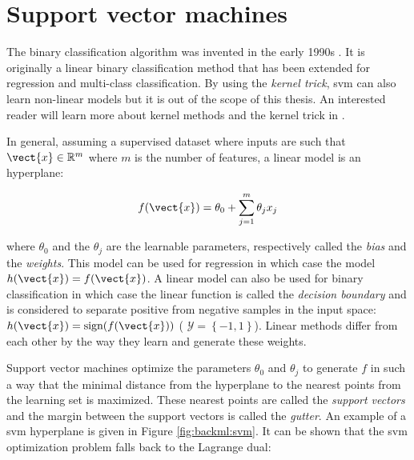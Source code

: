 
\section{Support vector machines}
\label{sec:backml:svm}

The  binary classification algorithm was invented in the early 1990s \cite{boser1992training}.
It is originally a linear binary classification method that has been extended for regression and multi-class classification.
By using the \textit{kernel trick}, \acrshort{svm} can also learn non-linear models
but it is out of the scope of this thesis. An interested reader will learn more
about kernel methods and the kernel trick in \cite{hastie2017elements}.

In general, assuming a supervised dataset where inputs are such that
$\vect{x} \in \mathbb{R}^m$ where $m$ is the number of features, a linear model
is an hyperplane:

\begin{equation}
\label{eqn:backml:linearmodel}
f(\vect{x}) = \theta_0 + \sum_{j=1}^m \theta_j x_j
\end{equation}

where $\theta_0$ and the $\theta_j$ are the learnable parameters, respectively
called the \textit{bias} and the \textit{weights}. This model can be used for
regression in which case the model $h(\vect{x}) = f(\vect{x})$. A linear model
can also be used for binary classification in which case the linear function is
called the \textit{decision boundary} and is considered to separate positive from
negative samples in the input space: $h(\vect{x}) = \text{sign}(f(\vect{x}))$ (\ie
$\mathcal{Y} = \left\{-1, 1\right\}$). Linear methods differ from each other by
the way they learn and generate these weights.

Support vector machines optimize the parameters $\theta_0$ and $\theta_j$ to
generate $f$ in such a way that the minimal distance from the hyperplane to the
nearest points from the learning set is maximized. These nearest points are called
the \textit{support vectors} and the margin between the support vectors is called
the \textit{gutter}. An example of a \acrshort{svm} hyperplane is given in Figure
\ref{fig:backml:svm}. It can be shown that the \acrshort{svm} optimization problem
falls back to the Lagrange dual:

